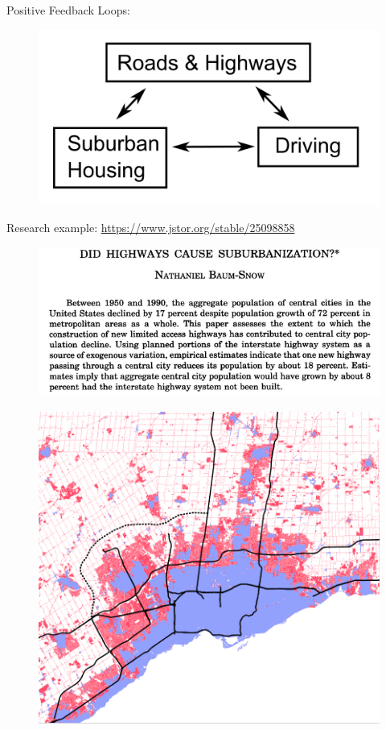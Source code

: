 \documentclass[aspectratio=169]{beamer}
\begin{document}
\begin{frame}
	
	Positive Feedback Loops:
	
	\begin{figure}
		\centering
		\includegraphics[width=0.4\linewidth]{images/feedback_suburb_driving.png}
	\end{figure}

	Research example: \small\url{https://www.jstor.org/stable/25098858}

\begin{figure}
	\centering
	\includegraphics[width=0.7\linewidth]{images/baumsnow_highways.png}
\end{figure}
		
\end{frame}

	
	
\begin{frame}
	
	\begin{figure}
		\centering
		\includegraphics[width=0.7\linewidth]{images/highways_dev_toronto.png}
	\end{figure}
	
\end{frame}
	
\end{document}
